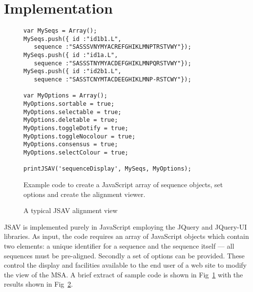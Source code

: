 \documentclass[a4]{article}
\begin{document}
\section{Implementation}

\begin{figure}
\footnotesize
\begin{verbatim}
var MySeqs = Array();
MySeqs.push({ id :"id1b1.L",  
   sequence :"SASSSVNYMYACREFGHIKLMNPTRSTVWY"});
MySeqs.push({ id :"id1a.L",   
   sequence :"SASSSTNYMYACDEFGHIKLMNPQRSTVWY"});
MySeqs.push({ id :"id2b1.L",  
   sequence :"SASSTCNYMTACDEEGHIKLMNP-RSTCWY"});

var MyOptions = Array();
MyOptions.sortable = true;
MyOptions.selectable = true;
MyOptions.deletable = true;
MyOptions.toggleDotify = true;
MyOptions.toggleNocolour = true;
MyOptions.consensus = true;
MyOptions.selectColour = true;

printJSAV('sequenceDisplay', MySeqs, MyOptions);
\end{verbatim}
\caption{\label{fig:code}Example code to create a
JavaScript array of sequence objects, set options and 
create the alignment viewer.}
\end{figure}

\begin{figure}
\caption{\label{fig:demo}A typical JSAV alignment view}
\end{figure}


JSAV is implemented purely in JavaScript employing the JQuery and
JQuery-UI libraries. As input, the code requires an array of
JavaScript objects which contain two elements: a unique identifier for
a sequence and the sequence itself --- all sequences must be
pre-aligned.  Secondly a set of options can be provided. These control
the display and facilities available to the end user of a web site to
modify the view of the MSA.  A brief extract of sample code is shown
in Fig~\ref{fig:code} with the results shown in Fig~\ref{fig:demo}.
\end{document}
